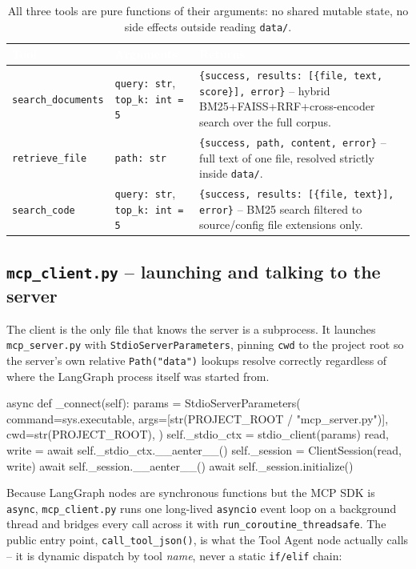 \documentclass[11pt,a4paper]{article}
\begin{document}
\begin{table}[H]
\centering
\small
\begin{tabularx}{\textwidth}{@{}l X X@{}}
\toprule
\rowcolor{navylight}
\textcolor{white}{\textbf{Tool}} & \textcolor{white}{\textbf{Arguments}} & \textcolor{white}{\textbf{Returns}} \\
\midrule
\texttt{search\_documents} & \texttt{query: str}, \texttt{top\_k: int = 5} &
\texttt{\{success, results: [\{file, text, score\}], error\}} -- hybrid BM25+FAISS+RRF+cross-encoder search over the full corpus. \\
\addlinespace
\texttt{retrieve\_file} & \texttt{path: str} &
\texttt{\{success, path, content, error\}} -- full text of one file, resolved strictly inside \texttt{data/}. \\
\addlinespace
\texttt{search\_code} & \texttt{query: str}, \texttt{top\_k: int = 5} &
\texttt{\{success, results: [\{file, text\}], error\}} -- BM25 search filtered to source/config file extensions only. \\
\bottomrule
\end{tabularx}
\caption{All three tools are pure functions of their arguments: no shared mutable state, no side effects outside reading \texttt{data/}.}
\end{table}

\subsection{\texttt{mcp\_client.py} -- launching and talking to the server}

The client is the only file that knows the server is a subprocess. It
launches \texttt{mcp\_server.py} with \texttt{StdioServerParameters},
pinning \texttt{cwd} to the project root so the server's own relative
\texttt{Path("data")} lookups resolve correctly regardless of where the
LangGraph process itself was started from.

\begin{pycode}
async def _connect(self):
    params = StdioServerParameters(
        command=sys.executable,
        args=[str(PROJECT_ROOT / "mcp_server.py")],
        cwd=str(PROJECT_ROOT),
    )
    self._stdio_ctx = stdio_client(params)
    read, write = await self._stdio_ctx.__aenter__()
    self._session = ClientSession(read, write)
    await self._session.__aenter__()
    await self._session.initialize()
\end{pycode}

Because LangGraph nodes are synchronous functions but the MCP SDK is
\texttt{async}, \texttt{mcp\_client.py} runs one long-lived
\texttt{asyncio} event loop on a background thread and bridges every call
across it with \texttt{run\_coroutine\_threadsafe}. The public entry point,
\texttt{call\_tool\_json()}, is what the Tool Agent node actually calls --
it is dynamic dispatch by tool \emph{name}, never a static
\texttt{if/elif} chain:
\end{document}
